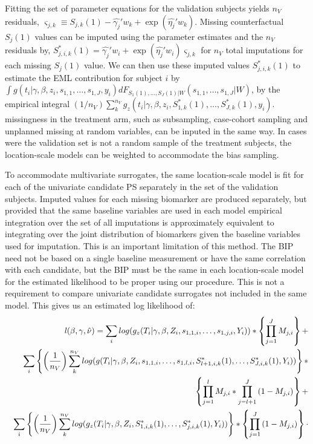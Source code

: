 \documentclass[times, doublespace]{simauth}
\begin{document}
Fitting the set of parameter equations for the validation subjects yields $n_V$ residuals, $\varsigma_{j,k} \equiv S_{j,k}(1) - \hat{\gamma_j}'w_{k} + \exp(\hat{\eta_j}'w_{k})$. Missing counterfactual $S_{j}(1)$ values can be imputed using the parameter estimates and the $n_V$ residuals by, $S_{j,i,k}^*(1) = \hat{\gamma_j}'w_{i} + \exp(\hat{\eta_j}'w_{i}) \varsigma_{j,k}$ for $n_V$ total imputations for each missing $S_{j}(1)$ value. We can then use these imputed values $S_{j,i,k}^*(1)$ to estimate the EML contribution for subject $i$ by $\int g(t_i|\gamma, \beta, z_i, s_{1,1}, \ldots, s_{1,J}, y_i)dF_{S_{1}(1),\ldots,S_{J}(1)|W}(s_{1,1},\ldots,s_{1,J}|W)$, by the empirical integral ${\left(1/n_{V}\right)}\sum_k^{n_V}{g_z(t_i|\gamma, \beta,z_i, S_{1,k}^*(1), \ldots,S_{J,k}^*(1),y_i)}$. missingness in the treatment arm, such as subsampling, case-cohort sampling and unplanned missing at random variables, can be inputed in the same way. In cases were the validation set is not a random sample of the treatment subjects, the location-scale models can be weighted to accommodate the bias sampling.  

To accommodate multivariate surrogates, the same location-scale model is fit for each of the univariate candidate PS separately in the set of the validation subjects. Imputed values for each missing biomarker are produced separately, but provided that the same baseline variables are used in each model empirical integration over the set of all imputations is approximately equivalent to integrating over the joint distribution of biomarkers given the baseline variables used for imputation. This is an important limitation of this method. The BIP need not be based on a single baseline measurement or have the same correlation with each candidate, but the BIP must be the same in each location-scale model for the estimated likelihood to be proper using our procedure. This is not a requirement to compare univariate candidate surrogates not included in the same model. This gives us an estimated log likelihood of:
\begin{eqnarray*}
&&\mathit{l}(\beta,\gamma, \hat{\nu})=\sum_{i} log(g_z(T_i|\gamma, \beta,Z_i, s_{1,1,i}, \ldots,s_{1,j,i},Y_i))*\left\{\prod_{j=1}^{J}{M
_{j,i}}\right\}+\\
&&\sum_{i}\left\{\left({1 \over n_{V}}\right)\sum_k^{n_V}{log(g(T_i|\gamma, \beta, Z_i,s_{1,1,i},\ldots, s_{1,l,i}, S^{*}_{l+1,i,k}(1),\ldots, S^{*}_{J,i,k}(1), Y_i))}\right\}*\\
&&\left\{\prod_{j=1}^{l}{M_{j,i}}*\prod_{j=l+1}^{J}{(1-M_{j,i})}\right\}+\\
&&\sum_{i}\left\{\left({1 \over n_{V}}\right)\sum_k^{n_V}{log(g_z(T_i|\gamma, \beta,Z_i, S_{1,i,k}^*(1), \ldots,S_{j,i,k}^*(1),Y_i))}\right\}*\left\{\prod_{j=1}^{J}{(1-M
_{j,i})}\right\}\cdot
\end{eqnarray*}
\end{document}
